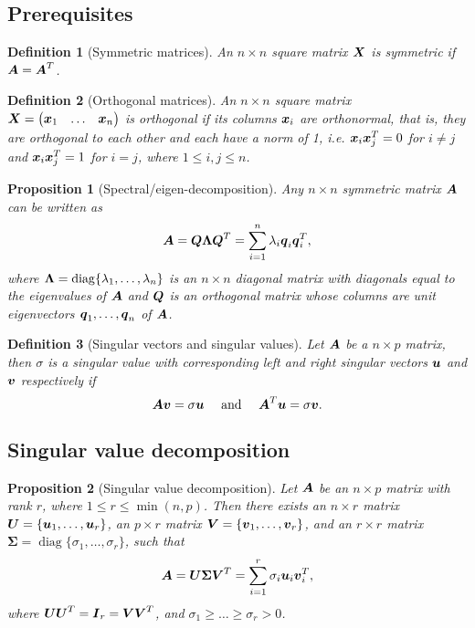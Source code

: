 \documentclass[12pt]{article}
\newtheorem{prop}{Proposition}[section]
\newtheorem{dfn}{Definition}[section]
\DeclareMathOperator{\diag}{diag}
\newcommand{\Sg}{\Sigma}
\begin{document}
	\subsection{Prerequisites}
	\begin{dfn}[Symmetric matrices]
		An $n\times n$ square matrix $\boldsymbol{X}$ is symmetric if $\boldsymbol{A}=\boldsymbol{A}^T$.
	\end{dfn}
	\begin{dfn}[Orthogonal matrices]
		An $n\times n$ square matrix $\boldsymbol{X}=\begin{pmatrix}
			\boldsymbol{x}_1 & \ldots & \boldsymbol{x}_n
		\end{pmatrix}$ is orthogonal if its columns $\boldsymbol{x}_i$ are orthonormal, that is, they are orthogonal to each other and each have a norm of 1, i.e. $\boldsymbol{x}_i\boldsymbol{x}_j^T=0$ for $i\neq j$ and $\boldsymbol{x}_i\boldsymbol{x}_j^T=1$ for $i=j$, where $1\leq i,j\leq n$.
	\end{dfn}
	\begin{prop}[Spectral/eigen-decomposition]
		Any $n\times n$ symmetric matrix $\boldsymbol{A}$ can be written as 
		$$\boldsymbol{A}=\boldsymbol{Q}\boldsymbol{\Lambda}\boldsymbol{Q}^T=\sum_{i=1}^{n}\lambda_i\boldsymbol{q}_i\boldsymbol{q}_i^T,$$
		where $\boldsymbol{\Lambda}=\diag\{\lm_1,\ldots,\lm_n\}$ is an $n\times n$ diagonal matrix with diagonals equal to the eigenvalues of $\boldsymbol{A}$ and $\boldsymbol{Q}$ is an orthogonal matrix whose columns are unit eigenvectors $\boldsymbol{q}_1,\ldots,\boldsymbol{q}_n$ of $\boldsymbol{A}$.
	\end{prop}
	\begin{dfn}[Singular vectors and singular values]
		Let $\boldsymbol{A}$ be a $n\times p$ matrix, then $\sigma$ is a singular value with corresponding left and right singular vectors $\boldsymbol{u}$ and $\boldsymbol{v}$ respectively if
		$$\boldsymbol{A}\boldsymbol{v}=\sigma\boldsymbol{u} \quad \text{ and }\quad \boldsymbol{A}^T\boldsymbol{u}=\sigma\boldsymbol{v}.$$
	\end{dfn}
	
	\subsection{Singular value decomposition}
	\begin{prop}[Singular value decomposition]
		Let $\boldsymbol{A}$ be an $n\times p$ matrix with rank $r$, where $1\leq r\leq \min(n,p)$. Then there exists an $n\times r$ matrix $\boldsymbol{U}=\{\boldsymbol{u}_1,\ldots,\boldsymbol{u}_r\}$, an $p\times r$ matrix $\boldsymbol{V}=\{\boldsymbol{v}_1,\ldots,\boldsymbol{v}_r\}$, and an $r\times r$ matrix $\boldsymbol{\Sg}=\diag\{\sigma_1,\ldots,\sigma_r\}$, such that
		$$\bmA=\bmU\boldsymbol{\Sg}\bmV^T=\sum_{i=1}^{r}\sigma_i\bmu_i\bmv_i^T,$$
		where $\boldsymbol{U}\boldsymbol{U}^T=\boldsymbol{I}_r=\boldsymbol{V}\boldsymbol{V}^T$, and $\sigma_1\geq\ldots\geq\sigma_r>0$.
	\end{prop}
	
\end{document}
